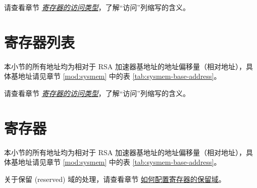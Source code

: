 \documentclass[main\_\_CN.tex]{subfiles}
\begin{document}
请查看章节 \hyperref[glossary-access-types]{\textit{寄存器的访问类型}}，了解“访问”列缩写的含义。




\hypertarget{rsa-reg-summ}{}
\section{寄存器列表}
\label{sec:rsa-reg-summ}
本小节的所有地址均为相对于 RSA 加速器基地址的地址偏移量（相对地址），具体基地址请见章节 \ref{mod:sysmem} \textit{} 中的表 \ref{tab:sysmem-base-address}。

请查看章节 \hyperref[glossary-access-types]{\textit{寄存器的访问类型}}，了解“访问”列缩写的含义。





\newpage
\section{寄存器}

本小节的所有地址均为相对于 RSA 加速器基地址的地址偏移量（相对地址），具体基地址请见章节 \ref{mod:sysmem} \textit{} 中的表 \ref{tab:sysmem-base-address}。

关于保留 (reserved) 域的处理，请查看章节 \hyperref[programming-reserved-field]{如何配置寄存器的保留域}。


\end{document}
